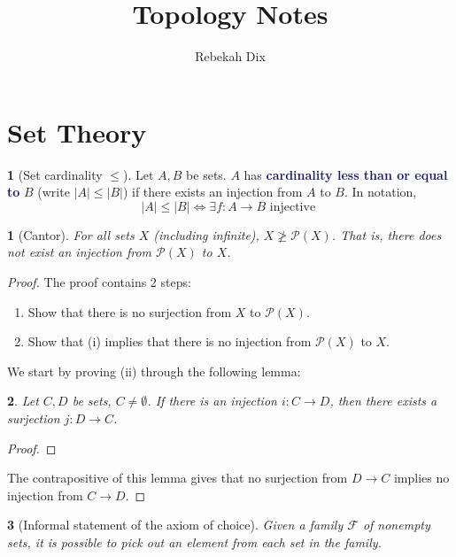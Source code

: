 \documentclass[11pt]{article}
\title{Topology Notes}
\author{Rebekah Dix}
\numberwithin{equation}{section}
\newcommand{\navy}[1]{\textcolor{MidnightBlue}{\bf #1}}
\theoremstyle{plain}
\newtheorem{theorem}{\color{ForestGreen}{\textbf{Theorem}}}[section]
\newtheorem{lemma}[theorem]{\color{ForestGreen}{\textbf{Lemma}}}
\theoremstyle{definition}
\newtheorem{definition}{\color{MidnightBlue}{\textbf{Definition}}}[section]
\newcommand\abs[1]{\left| #1 \right|}
\newcommand{\1}{\mathbbm 1}
\newcommand{\pP}{\mathcal P}
\newcommand{\fF}{\mathcal F}
\begin{document}
\maketitle
\tableofcontents
\newpage 

\listoftodos
\newpage

\section{Set Theory}

\begin{definition}[Set cardinality $\leq$]
	Let $A, B$ be sets. $A$ has \navy{cardinality less than or equal to} $B$ (write $\abs{A} \leq \abs{B}$) if there exists an injection from $A$ to $B$. In notation,
	\begin{equation}
		\abs{A} \leq \abs{B} \iff \exists f:A \to B \text{ injective }
	\end{equation} 
\end{definition}

\begin{theorem}[Cantor]
	For all sets $X$ (including infinite), $X \not\geq \pP(X)$. That is, there does not exist an injection from $\pP(X)$ to $X$. 
\end{theorem}
\begin{proof}
	The proof contains 2 steps:
	\begin{enumerate}
		\item Show that there is no surjection from $X$ to $\pP(X)$. 
		\item Show that (i) implies that there is no injection from $\pP(X)$ to $X$. 
	\end{enumerate}

	We start by proving (ii) through the following lemma:
	\begin{lemma}
		Let $C,D$ be sets, $C \neq \emptyset$. If there is an injection $i:C \to D$, then there exists a surjection $j: D \to C$. 
	\end{lemma}
	\begin{proof}
		
	\end{proof}
	The contrapositive of this lemma gives that no surjection from $D \to C$ implies no injection from $C \to D$. 
\end{proof}

\begin{theorem}[Informal statement of the axiom of choice]
	Given a family $\fF$ of nonempty sets, it is possible to pick out an element from each set in the family. 
\end{theorem}
\end{document}

